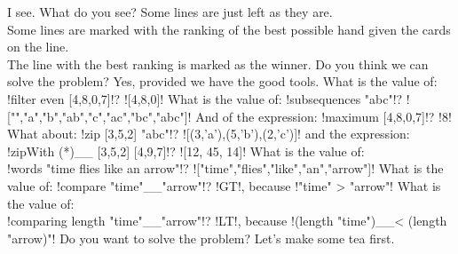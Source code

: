 \lhA I see. 
\lhN What do you see?
\lhA Some lines are just left as they are. \\
Some lines are marked with the ranking of the best possible hand given the cards on the line.\\
The line with the best ranking is marked as the winner.
\lhN Do you think we can solve the problem?
\lhA Yes, provided we have the good tools.
\lhN What is the value of:  \il!filter even [4,8,0,7]!?
\lhA \il![4,8,0]!
\lhN What is the value of:  \il!subsequences "abc"!?
\lhA \il!["","a","b","ab","c","ac","bc","abc"]!
\lhN And of the expression: \il!maximum [4,8,0,7]!? 
\lhA \il!8!
\lhN What about: \il!zip [3,5,2] "abc"!?
\lhA \il![(3,'a'),(5,'b'),(2,'c')]!
\lhN and  the expression: \il!zipWith (*)__ [3,5,2] [4,9,7]!?
\lhA \il![12, 45, 14]!
\lhN What is the value of: \\ \il!words "time flies like an arrow"!?
\lhA \il!["time","flies","like","an","arrow"]!
\lhN What is the value of: \il!compare "time"__"arrow"!?
\lhA \il!GT!, because \il!"time" > "arrow"!
\lhN What is the value of:\\ \il!comparing length "time"__"arrow"!?
\lhA \il!LT!, because \il!(length "time")__< (length "arrow)"!
\lhN Do you want to solve the problem? 
\lhA Let's make some tea first.
\lhend








